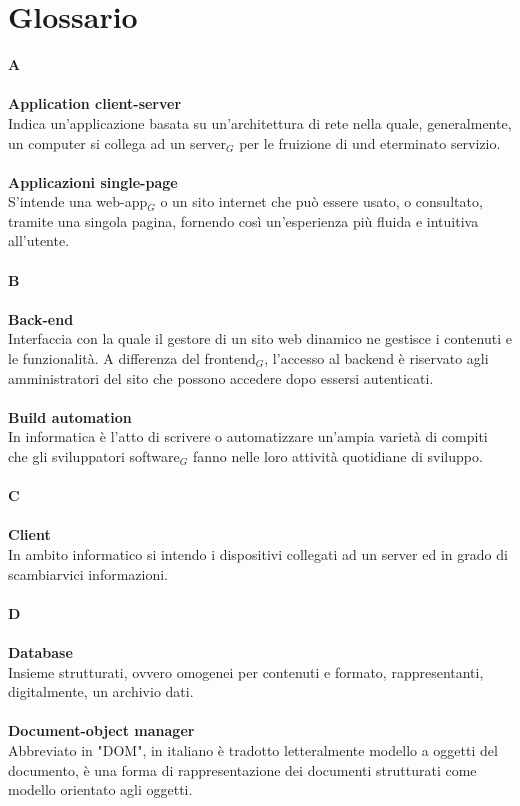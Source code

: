 \chapter{Glossario} \label{Glossario}
\textbf{A}\\
\\
\textbf{Application client-server} \\
Indica un'applicazione basata su un'architettura di rete nella quale, generalmente, un computer si collega ad un server$_G$ per le fruizione di und eterminato servizio.\\
\\
\textbf{Applicazioni single-page} \\
S'intende una web-app$_G$ o un sito internet che può essere usato, o consultato, tramite una singola pagina, fornendo così un'esperienza più fluida e intuitiva all'utente.\\
\\
\textbf{B} \\
\\
\textbf{Back-end} \\
Interfaccia con la quale il gestore di un sito web dinamico ne gestisce i contenuti e le funzionalità. A differenza del frontend$_G$, l'accesso al backend è riservato agli amministratori del sito che possono accedere dopo essersi autenticati.\\
\\
\textbf{Build automation} \\
In informatica è l'atto di scrivere o automatizzare un'ampia varietà di compiti che gli sviluppatori software$_G$ fanno nelle loro attività quotidiane di sviluppo.\\
\\
\textbf{C} \\
\\
\textbf{Client} \\
In ambito informatico si intendo i dispositivi collegati ad un server ed in grado di scambiarvici informazioni.\\
\\
\textbf{D} \\
\\
\textbf{Database} \\
Insieme strutturati, ovvero omogenei per contenuti e formato, rappresentanti, digitalmente, un archivio dati.\\
\\
\textbf{Document-object manager} \\
Abbreviato in "DOM", in italiano è tradotto letteralmente modello a oggetti del documento, è una forma di rappresentazione dei documenti strutturati come modello orientato agli oggetti.\\
